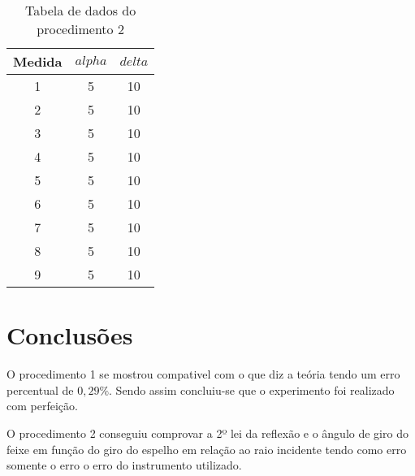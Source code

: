 \documentclass [a4paper, 12pt]{article}
\begin{document}
\begin{table}[h]
\centering
\caption{Tabela de dados do procedimento 2}
\vspace{0.5cm}
\begin{tabular}{|c|c|c|} \hline
Medida & $alpha$ & $delta$  \\ %
\hline                               %
1   &   5   &   10      \\  \hline
2   &   5   &   10      \\  \hline
3   &   5   &   10      \\  \hline
4   &   5   &   10      \\  \hline
5   &   5   &   10      \\  \hline
6   &   5   &   10      \\  \hline
7   &   5   &   10      \\  \hline
8   &   5   &   10      \\  \hline
9   &   5   &   10      \\  \hline
\end{tabular}
\end{table}

\section{Conclusões}

O procedimento 1 se mostrou compativel com o que diz a teória tendo um erro percentual de $0,29 \%$. Sendo assim concluiu-se que o experimento foi realizado com perfeição.

O procedimento 2 conseguiu comprovar a 2º lei da reflexão e  o ângulo de giro do feixe em função do giro do espelho em relação ao raio incidente tendo como erro somente o erro o erro do instrumento utilizado.
\end{document}
